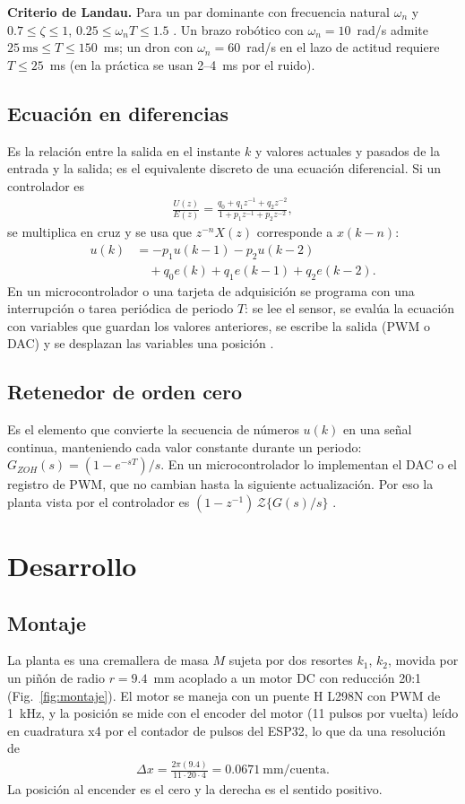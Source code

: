 \documentclass[conference]{IEEEtran}
\begin{document}
\textbf{Criterio de Landau.} Para un par dominante con frecuencia natural
$\omega_n$ y $0.7 \le \zeta \le 1$, $0.25 \le \omega_n T \le 1.5$
\cite{landau2006}. Un brazo robótico con $\omega_n = 10$~rad/s admite
$25~\text{ms} \le T \le 150$~ms; un dron con $\omega_n = 60$~rad/s en el lazo
de actitud requiere $T \le 25$~ms (en la práctica se usan 2--4~ms por el ruido).

\subsection{Ecuación en diferencias}
Es la relación entre la salida en el instante $k$ y valores actuales y
pasados de la entrada y la salida; es el equivalente discreto de una ecuación
diferencial. Si un controlador es
\begin{align*}
  \frac{U(z)}{E(z)} = \frac{q_0+q_1z^{-1}+q_2z^{-2}}{1+p_1z^{-1}+p_2z^{-2}},
\end{align*}
se multiplica en cruz y se usa que $z^{-n}X(z)$ corresponde a $x(k-n)$:
\begin{align*}
  u(k) &= -p_1u(k-1) - p_2u(k-2)\\
       &\quad + q_0e(k) + q_1e(k-1) + q_2e(k-2).
\end{align*}
En un microcontrolador o una tarjeta de adquisición se programa con una
interrupción o tarea periódica de periodo $T$: se lee el sensor, se evalúa la
ecuación con variables que guardan los valores anteriores, se escribe la
salida (PWM o DAC) y se desplazan las variables una posición \cite{franklin1998}.

\subsection{Retenedor de orden cero}
Es el elemento que convierte la secuencia de números $u(k)$ en una señal
continua, manteniendo cada valor constante durante un periodo:
$G_{ZOH}(s) = (1 - e^{-sT})/s$. En un microcontrolador lo implementan el DAC o
el registro de PWM, que no cambian hasta la siguiente actualización. Por eso la
planta vista por el controlador es $(1-z^{-1})\,\mathcal{Z}\{G(s)/s\}$
\cite{ogata1995}.

\section{Desarrollo}

\subsection{Montaje}
La planta es una cremallera de masa $M$ sujeta por dos resortes $k_1$, $k_2$,
movida por un piñón de radio $r=9.4$~mm acoplado a un motor DC con reducción
20:1 (Fig.~\ref{fig:montaje}). El motor se maneja con un puente H L298N con
PWM de 1~kHz, y la posición se mide con el encoder del motor (11 pulsos por
vuelta) leído en cuadratura x4 por el contador de pulsos del ESP32, lo que da
una resolución de
\begin{align*}
  \Delta x = \frac{2\pi(9.4)}{11\cdot 20\cdot 4} = 0.0671~\text{mm/cuenta}.
\end{align*}
La posición al encender es el cero y la derecha es el sentido positivo.
\end{document}
